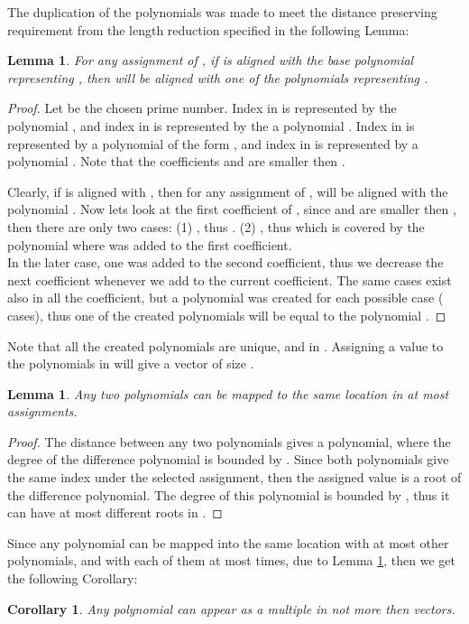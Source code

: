 \documentclass[11pt,amssymb]{article}
\newtheorem{lemma}[theorem]{Lemma}
\newtheorem{corollary}{Corollary}
\begin{document}
The duplication of the polynomials was made to meet the distance
preserving requirement from the length reduction specified in the
following Lemma:

\begin{lemma}\label{l:PolAllignment}
For any assignment of , if  is aligned with the base
polynomial representing , then  will be aligned with
one of the polynomials representing .
\end{lemma}
\begin{proof}
Let  be the chosen prime number. Index  in  is
represented by the polynomial , and index  in  is
represented by the a polynomial .
Index  in  is represented by a polynomial of the form
, and index  in  is
represented by a polynomial . Note
that the coefficients  and  are smaller then .

Clearly, if  is aligned with , then for any
assignment of ,  will be aligned with the polynomial
. Now lets
look at the first coefficient of , since  and  are
smaller then , then there are only two cases: (1)
, thus . (2)
, thus 
which is covered by the
polynomial where  was added to the first coefficient.\\
In the later case, one was added to the second coefficient, thus we
decrease the next coefficient whenever we add  to the
current coefficient. The same cases exist also in all the
coefficient, but a polynomial was created for each possible case (
cases), thus one of the created polynomials will be equal to the
polynomial . 
\end{proof}

Note that all the  created polynomials are unique, and
in . Assigning a value to the polynomials in  will give a
vector of size .

\begin{lemma}\label{l:maxRoots}
Any two polynomials can be mapped to the same location in at most
 assignments.
\end{lemma}
\begin{proof}
The distance between any two polynomials gives a polynomial, where the
degree of the difference polynomial is bounded by . Since both
polynomials give the same index under the selected assignment, then the
assigned value is a root of the difference polynomial. The degree of
this polynomial is bounded by , thus it can have at most 
different roots in . 
\end{proof}

Since any polynomial can be mapped into the same location with at most
 other polynomials, and with each of them at most 
times, due to Lemma \ref{l:maxRoots}, then we get the following
Corollary:
\begin{corollary}\label{c:maxPolMultiples}
Any polynomial can appear as a {\it multiple} in not more then  vectors.
\end{corollary}
\end{document}
